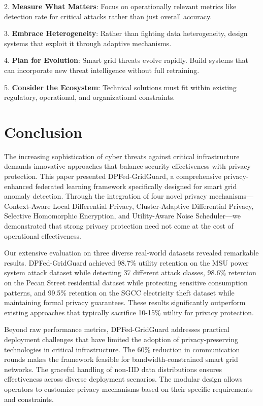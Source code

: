 \documentclass{ieeeaccess}
\theoremstyle{definition}
\begin{document}
2. \textbf{Measure What Matters}: Focus on operationally relevant metrics like detection rate for critical attacks rather than just overall accuracy.

3. \textbf{Embrace Heterogeneity}: Rather than fighting data heterogeneity, design systems that exploit it through adaptive mechanisms.

4. \textbf{Plan for Evolution}: Smart grid threats evolve rapidly. Build systems that can incorporate new threat intelligence without full retraining.

5. \textbf{Consider the Ecosystem}: Technical solutions must fit within existing regulatory, operational, and organizational constraints.

\section{Conclusion}
\label{sec:conclusion}

The increasing sophistication of cyber threats against critical infrastructure demands innovative approaches that balance security effectiveness with privacy protection. This paper presented DPFed-GridGuard, a comprehensive privacy-enhanced federated learning framework specifically designed for smart grid anomaly detection. Through the integration of four novel privacy mechanisms—Context-Aware Local Differential Privacy, Cluster-Adaptive Differential Privacy, Selective Homomorphic Encryption, and Utility-Aware Noise Scheduler—we demonstrated that strong privacy protection need not come at the cost of operational effectiveness.

Our extensive evaluation on three diverse real-world datasets revealed remarkable results. DPFed-GridGuard achieved 98.7\% utility retention on the MSU power system attack dataset while detecting 37 different attack classes, 98.6\% retention on the Pecan Street residential dataset while protecting sensitive consumption patterns, and 99.5\% retention on the SGCC electricity theft dataset while maintaining formal privacy guarantees. These results significantly outperform existing approaches that typically sacrifice 10-15\% utility for privacy protection.

Beyond raw performance metrics, DPFed-GridGuard addresses practical deployment challenges that have limited the adoption of privacy-preserving technologies in critical infrastructure. The 60\% reduction in communication rounds makes the framework feasible for bandwidth-constrained smart grid networks. The graceful handling of non-IID data distributions ensures effectiveness across diverse deployment scenarios. The modular design allows operators to customize privacy mechanisms based on their specific requirements and constraints.
\end{document}
